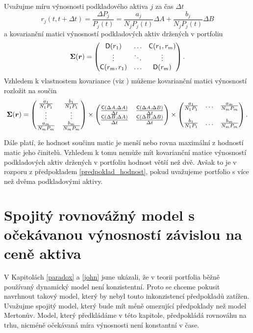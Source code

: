 \documentclass[a4paper,12pt]{report}
\theoremstyle{definition} \newtheorem{definice}[veta]{Definice}
\theoremstyle{remark}
\begin{document}
Uvažujme míru výnosnosti podkladového aktiva $j$ za čas $\Delta t$
\begin{displaymath}
r_j(t,t+\Delta t)=\frac{\Delta P_j}{P_j(t)}=\frac{a_j}{N_jP_j(t)}\Delta A + \frac{b_j}{N_jP_j(t)}\Delta B
\end{displaymath}
a kovarianční matici výnosností podkladových aktiv držených v portfoliu
$$\boldsymbol{\Sigma}(\boldsymbol{r})=
\begin{pmatrix}
\mathsf{D}(r_1)  & \ldots & \mathsf{C}(r_1,r_m)  \cr \vdots & \ddots & \vdots\cr \mathsf{C}(r_m,r_1)   & \ldots & \mathsf{D}(r_m) 
\end{pmatrix}.$$
Vzhledem k vlastnostem kovariance (viz \cite{andel}) můžeme kovarianční matici výnosností rozložit na součin 
$$
\boldsymbol{\Sigma}(\boldsymbol{r})= 
\begin{pmatrix}
\frac{a_1}{N_1P_1} & \frac{b_1}{N_1P_1}\cr \vdots & \vdots\cr \frac{a_m}{N_mP_m} & \frac{b_m}{N_mP_m}
\end{pmatrix}
\times
\begin{pmatrix}
\frac{\mathsf{C}(\Delta A, \Delta A)}{\Delta t} &
\frac{\mathsf{C}(\Delta A, \Delta B)}{\Delta t} \cr
\frac{\mathsf{C}(\Delta B, \Delta A)}{\Delta t} & \frac{\mathsf{C}(\Delta B,
\Delta B)}{\Delta t} 
\end{pmatrix}
\times
\begin{pmatrix}
\frac{a_1}{N_1P_1} & \ldots & \frac{a_m}{N_mP_m}\cr \cr \frac{b_1}{N_1P_1} & \ldots &
\frac{b_m}{N_mP_m}
\end{pmatrix}.
$$

Dále platí, že hodnost součinu matic je menší nebo rovna maximální z hodností matic jeho činitelů.
Vzhledem k tomu nemůže mít kovarianční matice výnosností podkladových aktiv držených v portfoliu hodnost větší než dvě.
Avšak to je v rozporu z předpokladem \ref{predpoklad_hodnost}, pokud uvažujeme portfolio s více než dvěma podkladovými aktivy.


\section{Spojitý rovnovážný model s očekávanou výnosností závislou na ceně aktiva}\label{muj_model}
V Kapitolách \ref{paradox} a \ref{john} jsme ukázali, že v teorii portfolia běžně používaný dynamický model není konzistentní.
Proto se chceme pokusit navrhnout takový model, který by nebyl touto inkonzistencí předpokladů zatížen.
Uvažujme spojitý model, který bude mít méně omezující předpoklady než model Mertonův.
Model, který předkládáme v této kapitole, předpokládá rovnováhu na trhu, nicméně očekávaná míra výnosnosti není konstantní v čase.
\end{document}
